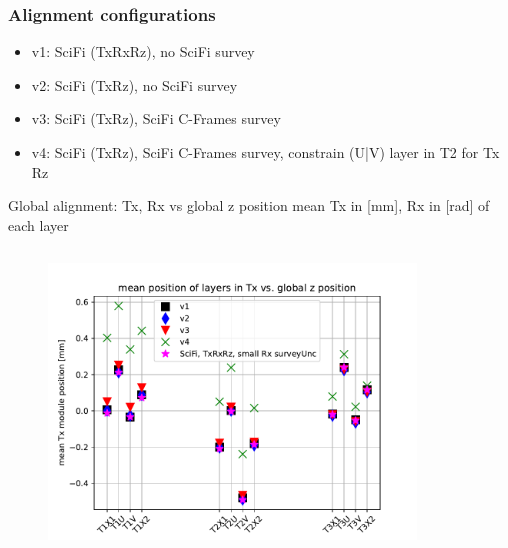 \documentclass[aspectratio=1610, 12pt]{beamer}
\begin{document}
\begin{frame}\frametitle{Alignment configurations}
  \begin{itemize}
    \item v1: SciFi (TxRxRz), no SciFi survey
    \item v2: SciFi (TxRz), no SciFi survey
    \item v3: SciFi (TxRz), SciFi C-Frames survey
    \item v4: SciFi (TxRz), SciFi C-Frames survey, constrain (U|V) layer in T2 for Tx Rz
  \end{itemize}
\end{frame}

\begin{frame}{Global alignment: Tx, Rx vs global z position}
  mean Tx in [mm], Rx in [rad] of each layer
  \begin{columns}
    \begin{column}[c]{0.5\textwidth}
      \begin{figure}
        \includegraphics[width=\textwidth]{plots/outfiles_vs_global/all_runs_retest_glob_z_vs_local_Tx.pdf}
      \end{figure}
    \end{column}
    \begin{column}[c]{0.5\textwidth}
      \begin{figure}

\end{figure}
\end{column}
\end{columns}
\end{frame}
\end{document}
